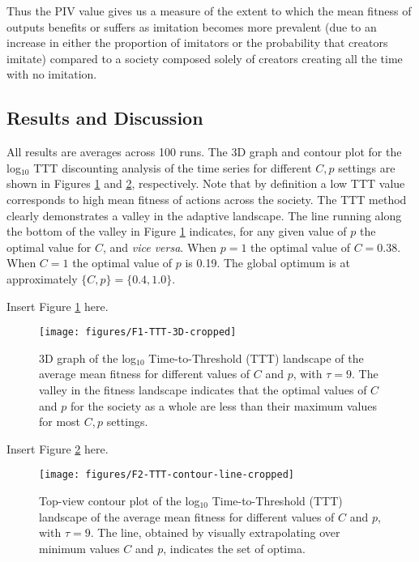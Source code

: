 \documentclass[a4paper,12pt,man,british]{apa6}
\begin{document}
\noindent Thus the PIV value gives us a measure of the extent to which the mean fitness of outputs benefits or suffers as imitation becomes more prevalent (due to an increase in either the proportion of imitators or the probability that creators imitate) compared to a society composed solely of creators creating all the time with no imitation.

\subsection{Results and Discussion}
All results are averages across 100 runs. The 3D graph and contour plot for the log$_{10}$ TTT discounting analysis of the time series for different ${C,p}$ settings are shown in Figures \ref{fig:TTT-cropped} and \ref{fig:TTT-contour-line-cropped}, respectively. Note that by definition a low TTT value corresponds to high mean fitness of actions across the society. The TTT method clearly demonstrates a valley in the adaptive landscape. The line running along the bottom of the valley in Figure \ref{fig:TTT-cropped} indicates, for any given value of $p$ the optimal value for $C$, and \emph{vice versa}. When $p = 1$ the optimal value of $C = 0.38$. When $C = 1$ the optimal value of $p$ is 0.19. The global optimum is at approximately $\{C,p\} = \{0.4,1.0\}$. 

\begin{center} %
Insert Figure \ref{fig:TTT-cropped} here.
\end{center}

\begin{figure}
\centering
\texttt{[image: figures/F1-TTT-3D-cropped]}
\caption{3D graph of the log$_{10}$ Time-to-Threshold (TTT) landscape of the average mean fitness for different values of $C$ and $p$, with $\tau = 9$. The valley in the fitness landscape indicates that the optimal values of $C$ and $p$ for the society as a whole are less than their maximum values for most ${C,p}$ settings.}
\label{fig:TTT-cropped}
\end{figure}

\begin{center}
Insert Figure \ref{fig:TTT-contour-line-cropped} here.
\end{center}

\begin{figure}
\centering
\texttt{[image: figures/F2-TTT-contour-line-cropped]}
\caption{Top-view contour plot of the log$_{10}$ Time-to-Threshold (TTT) landscape of the average mean fitness for different values of $C$ and $p$, with $\tau = 9$. The line, obtained by visually extrapolating over minimum values $C$ and $p$, indicates the set of optima.}
\label{fig:TTT-contour-line-cropped}
\end{figure}
\end{document}
